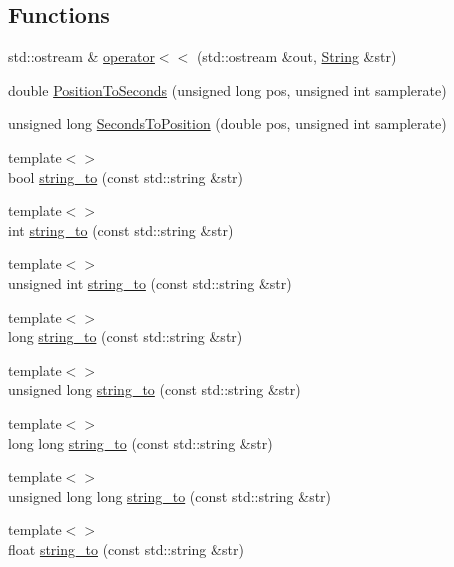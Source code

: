 \subsection*{Functions}
\begin{DoxyCompactItemize}
\item 
std\-::ostream \& \hyperlink{namespacemaudio_a7070d9eae8ae41622f27a9be934553db}{operator$<$$<$} (std\-::ostream \&out, \hyperlink{classmaudio_1_1String}{String} \&str)
\item 
double \hyperlink{namespacemaudio_a624b3ae26d22ed10aff2ea4ca30cccb9}{Position\-To\-Seconds} (unsigned long pos, unsigned int samplerate)
\item 
unsigned long \hyperlink{namespacemaudio_a7758f1350eec63d5e2c53b53c7b94e98}{Seconds\-To\-Position} (double pos, unsigned int samplerate)
\item 
{\footnotesize template$<$$>$ }\\bool \hyperlink{namespacemaudio_a2d654491da7fc170d7a7964ce0b731d4}{string\-\_\-to} (const std\-::string \&str)
\item 
{\footnotesize template$<$$>$ }\\int \hyperlink{namespacemaudio_abd2a2d0df80160032ac8d0aa1c3f9127}{string\-\_\-to} (const std\-::string \&str)
\item 
{\footnotesize template$<$$>$ }\\unsigned int \hyperlink{namespacemaudio_ae6b161f5d6e32d4ce9a01f7a0864974e}{string\-\_\-to} (const std\-::string \&str)
\item 
{\footnotesize template$<$$>$ }\\long \hyperlink{namespacemaudio_a2bc6a8185dba9ec28cca07e799e7fdff}{string\-\_\-to} (const std\-::string \&str)
\item 
{\footnotesize template$<$$>$ }\\unsigned long \hyperlink{namespacemaudio_a7950b9c78e70dbbc482d9928003a8e5e}{string\-\_\-to} (const std\-::string \&str)
\item 
{\footnotesize template$<$$>$ }\\long long \hyperlink{namespacemaudio_a207327b34ea75267d1ba8ebc4ba6e2b7}{string\-\_\-to} (const std\-::string \&str)
\item 
{\footnotesize template$<$$>$ }\\unsigned long long \hyperlink{namespacemaudio_a8432fa28659444f95bb169913702efad}{string\-\_\-to} (const std\-::string \&str)
\item 
{\footnotesize template$<$$>$ }\\float \hyperlink{namespacemaudio_a889748e3ebd5e89966743120836fa6af}{string\-\_\-to} (const std\-::string \&str)

\end{DoxyCompactItemize}
